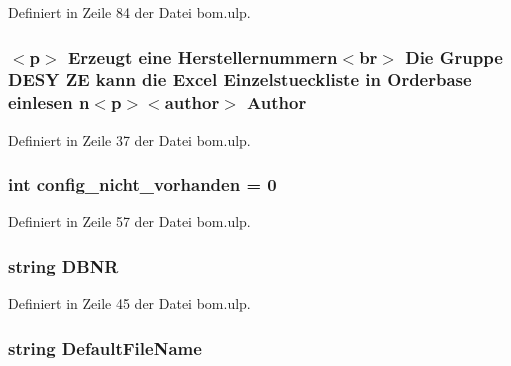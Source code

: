 Definiert in Zeile 84 der Datei bom.\+ulp.

\hypertarget{bom_8ulp_a7dac06bee1af56d0789d1cac5656a69a}{}
\subsubsection[{Author}]{\setlength{\rightskip}{0pt plus 5cm}$<$p$>$ Erzeugt eine Herstellernummern$<$br$>$ Die {\bf Gruppe} D\+E\+S\+Y Z\+E kann die Excel Einzelstueckliste in Orderbase einlesen {\bf n}$<$p$>$$<$author$>$ Author}\label{bom_8ulp_a7dac06bee1af56d0789d1cac5656a69a}


Definiert in Zeile 37 der Datei bom.\+ulp.

\hypertarget{bom_8ulp_a45e22d9db317238127f2a1d385e17c1c}{}
\subsubsection[{config\+\_\+nicht\+\_\+vorhanden}]{\setlength{\rightskip}{0pt plus 5cm}int config\+\_\+nicht\+\_\+vorhanden = 0}\label{bom_8ulp_a45e22d9db317238127f2a1d385e17c1c}


Definiert in Zeile 57 der Datei bom.\+ulp.

\hypertarget{bom_8ulp_a96dcbff778ab4d94b74cc4942d070162}{}
\subsubsection[{D\+B\+N\+R}]{\setlength{\rightskip}{0pt plus 5cm}string D\+B\+N\+R}\label{bom_8ulp_a96dcbff778ab4d94b74cc4942d070162}


Definiert in Zeile 45 der Datei bom.\+ulp.

\hypertarget{bom_8ulp_ab651eee79234101e84eed5bb2c5f9500}{}
\subsubsection[{Default\+File\+Name}]{\setlength{\rightskip}{0pt plus 5cm}string Default\+File\+Name}\label{bom_8ulp_ab651eee79234101e84eed5bb2c5f9500}


